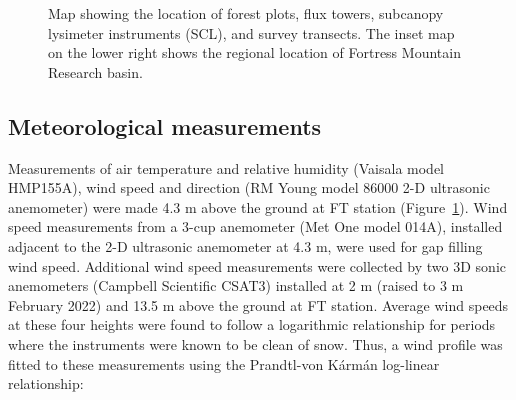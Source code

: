 \documentclass[
  letterpaper,
  DIV=11,
  numbers=noendperiod]{scrartcl}
\begin{document}
\begin{figure}[H]


\caption{\label{fig-site-map}Map showing the location of forest plots,
flux towers, subcanopy lysimeter instruments (SCL), and survey
transects. The inset map on the lower right shows the regional location
of Fortress Mountain Research basin.}

\end{figure}%

\subsection{Meteorological
measurements}\label{meteorological-measurements}

Measurements of air temperature and relative humidity (Vaisala model
HMP155A), wind speed and direction (RM Young model 86000 2-D ultrasonic
anemometer) were made 4.3 m above the ground at FT station
(Figure~\ref{fig-site-map}). Wind speed measurements from a 3-cup
anemometer (Met One model 014A), installed adjacent to the 2-D
ultrasonic anemometer at 4.3 m, were used for gap filling wind speed.
Additional wind speed measurements were collected by two 3D sonic
anemometers (Campbell Scientific CSAT3) installed at 2 m (raised to 3 m
February 2022) and 13.5 m above the ground at FT station. Average wind
speeds at these four heights were found to follow a logarithmic
relationship for periods where the instruments were known to be clean of
snow. Thus, a wind profile was fitted to these measurements using the
Prandtl-von Kármán log-linear relationship:
\end{document}
